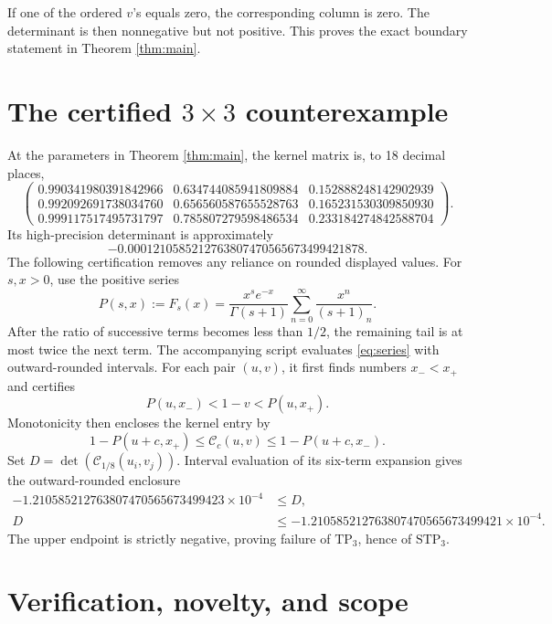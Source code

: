 \documentclass[11pt]{article}
\newcommand{\Cc}{\mathcal C}
\newcommand{\STP}{\mathrm{STP}}
\newcommand{\TP}{\mathrm{TP}}
\begin{document}
If one of the ordered \(v\)'s equals zero, the corresponding column is zero.
The determinant is then nonnegative but not positive.  This proves the exact
boundary statement in Theorem \ref{thm:main}.

\section*{The certified \texorpdfstring{\(3\times3\)}{3x3} counterexample}

At the parameters in Theorem \ref{thm:main}, the kernel matrix is, to 18
decimal places,
{\small
\[
\begin{pmatrix}
0.990341980391842966&0.634744085941809884&0.152888248142902939\\
0.992092691738034760&0.656560587655528763&0.165231530309850930\\
0.999117517495731797&0.785807279598486534&0.233184274842588704
\end{pmatrix}.
\]
}
Its high-precision determinant is approximately
\[
 -0.0001210585212763807470565673499421878.
\]
The following certification removes any reliance on rounded displayed values.
For \(s,x>0\), use the positive series
\begin{equation}\label{eq:series}
 P(s,x):=F_s(x)
 =\frac{x^se^{-x}}{\Gamma(s+1)}
   \sum_{n=0}^{\infty}\frac{x^n}{(s+1)_n}.
\end{equation}
After the ratio of successive terms becomes less than \(1/2\), the remaining
tail is at most twice the next term.  The accompanying script evaluates
\eqref{eq:series} with outward-rounded intervals.  For each pair \((u,v)\), it
first finds numbers \(x_-<x_+\) and certifies
\[
 P(u,x_-)<1-v<P(u,x_+).
\]
Monotonicity then encloses the kernel entry by
\[
 1-P(u+c,x_+)\le \Cc_c(u,v)\le 1-P(u+c,x_-).
\]
Set \(D=\det(\Cc_{1/8}(u_i,v_j))\).  Interval evaluation of its six-term
expansion gives the outward-rounded enclosure
\[
\begin{aligned}
 -1.210585212763807470565673499423\times10^{-4}&\le D,\\
 D&\le-1.210585212763807470565673499421\times10^{-4}.
\end{aligned}
\]
The upper endpoint is strictly negative, proving failure of \(\TP_3\), hence
of \(\STP_3\).

\section*{Verification, novelty, and scope}
\end{document}

